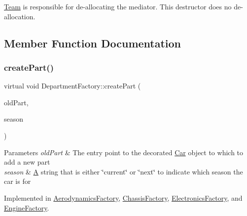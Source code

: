 \hyperlink{classTeam}{Team} is responsible for de-\/allocating the mediator. This destructor does no de-\/allocation. 

\subsection{Member Function Documentation}
\mbox{\label{classDepartmentFactory_a6080a560efb9fe0b9c870db5a7358886}} 
\subsubsection{\texorpdfstring{create\+Part()}{createPart()}}
{\footnotesize\ttfamily virtual void Department\+Factory\+::create\+Part (\begin{DoxyParamCaption}\item[{\hyperlink{classDepartmentOutput}{Department\+Output} $\ast$}]{old\+Part,  }\item[{string}]{season }\end{DoxyParamCaption})\hspace{0.3cm}{\ttfamily [pure virtual]}}


\begin{DoxyParams}{Parameters}
{\em old\+Part} & The entry point to the decorated \hyperlink{classCar}{Car} object to which to add a new part \\
\hline
{\em season} & \hyperlink{classA}{A} string that is either \char`\"{}current\char`\"{} or \char`\"{}next\char`\"{} to indicate which season the car is for \\
\hline
\end{DoxyParams}


Implemented in \hyperlink{classAerodynamicsFactory_a2c6e6ce04d21da014e3c0c6affe423ae}{Aerodynamics\+Factory}, \hyperlink{classChassisFactory_aeeb7d210e8c3ca1a3e3b2998705b0d90}{Chassis\+Factory}, \hyperlink{classElectronicsFactory_a6489d0e612615f65d76620585a67ff38}{Electronics\+Factory}, and \hyperlink{classEngineFactory_af8c2f4bf420b5d2f0742b3d38746cf40}{Engine\+Factory}.

\mbox{\label{classDepartmentFactory_a9a7fa0ea7860d17be0f3ef095d28a24e}} 
